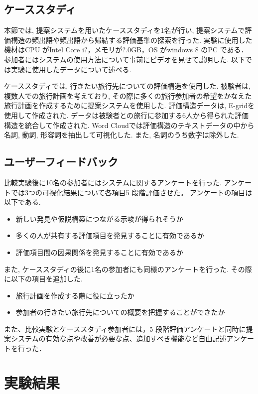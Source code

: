 \documentclass[syuuron]{kuee}
\begin{document}
	\section{ケーススタディ}
		本節では, 提案システムを用いたケーススタディを1名が行い, 提案システムで評価構造の頻出語や頻出語から帰結する評価基準の探索を行った. 
		実験に使用した機材はCPU がIntel Core i?，メモリが?.0GB，OS がwindows 8 のPC である．
		参加者にはシステムの使用方法について事前にビデオを見せて説明した. 以下では実験に使用したデータについて述べる. 
		
		ケーススタディでは, 行きたい旅行先についての評価構造を使用した. 
		被験者は, 複数人での旅行計画を考えており, その際に多くの旅行参加者の希望をかなえた旅行計画を作成するために提案システムを使用した. 
		評価構造データは, E-gridを使用して作成された. 
		データは被験者との旅行に参加する6人から得られた評価構造を統合して作成された. 
		Word Cloudでは評価構造のテキストデータの中から名詞, 動詞, 形容詞を抽出して可視化した. 
		また, 名詞のうち数字は除外した. 
		
	\section{ユーザーフィードバック}
		比較実験後に10名の参加者にはシステムに関するアンケートを行った. 
		アンケートでは3つの可視化結果について各項目5 段階評価させた。
		アンケートの項目は以下である. 
		\begin{itemize}
			\item 新しい発見や仮説構築につながる示唆が得られそうか
			\item 多くの人が共有する評価項目を発見することに有効であるか
			\item 評価項目間の因果関係を発見することに有効であるか
		\end{itemize}
		また, ケーススタディの後に1名の参加者にも同様のアンケートを行った. 
		その際に以下の項目を追加した. 
		\begin{itemize}
			\item 旅行計画を作成する際に役に立ったか
			\item 参加者の行きたい旅行先についての概要を把握することができたか
		\end{itemize}
		また、比較実験とケーススタディ参加者には，5 段階評価アンケートと同時に提案システムの有効な点や改善が必要な点、追加すべき機能など自由記述アンケートを行った．


\chapter{実験結果}
\end{document}
